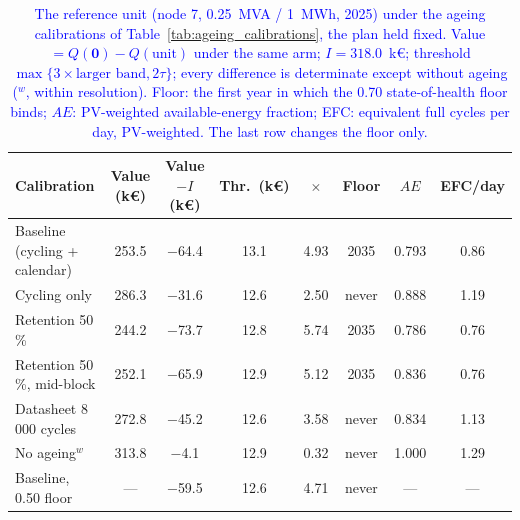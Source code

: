 \begin{table}[htbp!]
    \centering
    \caption{\textcolor{blue}{The reference unit (node 7, 0.25~MVA / 1~MWh, 2025) under the ageing calibrations of Table~\ref{tab:ageing_calibrations}, the plan held fixed. Value $= Q(\boldsymbol{0}) - Q(\text{unit})$ under the same arm; $I = 318.0$~k\euro; threshold $\max\{3 \times \text{larger band}, 2\tau\}$; every difference is determinate except without ageing ($^{w}$, within resolution). Floor: the first year in which the 0.70 state-of-health floor binds; $AE$: PV-weighted available-energy fraction; EFC: equivalent full cycles per day, PV-weighted. The last row changes the floor only.}}
    \label{tab:res_ageing}
    \scriptsize\setlength{\tabcolsep}{3pt}
    \begin{tabular}{l c c c c c c c}
        \toprule
        Calibration & Value (k\euro) & Value $- I$ (k\euro) & Thr.\ (k\euro) & $\times$ & Floor & $AE$ & EFC/day \\
        \midrule
        Baseline (cycling + calendar)   & 253.5 & $-$64.4 & 13.1 & 4.93 & 2035  & 0.793 & 0.86 \\
        Cycling only                    & 286.3 & $-$31.6 & 12.6 & 2.50 & never & 0.888 & 1.19 \\
        Retention 50\,\%                & 244.2 & $-$73.7 & 12.8 & 5.74 & 2035  & 0.786 & 0.76 \\
        Retention 50\,\%, mid-block     & 252.1 & $-$65.9 & 12.9 & 5.12 & 2035  & 0.836 & 0.76 \\
        Datasheet 8\,000 cycles         & 272.8 & $-$45.2 & 12.6 & 3.58 & never & 0.834 & 1.13 \\
        No ageing$^{w}$                 & 313.8 & $-$4.1  & 12.9 & 0.32 & never & 1.000 & 1.29 \\
        Baseline, 0.50 floor            & ---   & $-$59.5 & 12.6 & 4.71 & never & ---   & --- \\
        \bottomrule
    \end{tabular}
\end{table}

